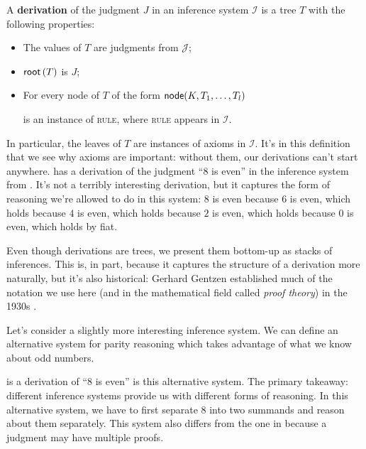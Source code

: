 \begin{definition}
  A \textbf{derivation} of the judgment $J$ in an inference system $\mathcal I$ is a tree $T$ with the following properties:
  \begin{itemize}
  \item The values of $T$ are judgments from $\mathcal J$;
  \item $\mathsf{root}\left(T\right)$ is $J$;
  \item For every node of $T$ of the form $\mathsf{node}(K, T_1, \dots, T_l)$
    \begin{mathpar}
    \end{mathpar}
    is an instance of \textsc{rule}, where \textsc{rule} appears in $\mathcal I$.
  \end{itemize}
\end{definition}
%
In particular, the leaves of $T$ are instances of axioms in $\mathcal I$.
It's in this definition that we see why axioms are important: without them, our derivations can't start anywhere.
 has a derivation of the judgment \enquote{$8$ is even} in the inference system from .
It's not a terribly interesting derivation, but it captures the form of reasoning we're allowed to do in this system: $8$ is even because $6$ is even, which holds because $4$ is even, which holds because $2$ is even, which holds because $0$ is even, which holds by fiat.
\begin{remark}
  Even though derivations are trees, we present them bottom-up as stacks of inferences.
  This is, in part, because it captures the structure of a derivation more naturally, but it's also historical: Gerhard Gentzen established much of the notation we use here (and in the mathematical field called \textit{proof theory}) in the 1930s \cite{gentzen1964investigations}.
\end{remark}
%

\begin{example}
  \label{ex:even-alt}
  Let's consider a slightly more interesting inference system.
  We can define an alternative system for parity reasoning which takes advantage of what we know about odd numbers.
\end{example}
 is a derivation of \enquote{8 is even} is this alternative system.
The primary takeaway: different inference systems provide us with different forms of reasoning.
In this alternative system, we have to first separate $8$ into two summands and reason about them separately.
This system also differs from the one in  because a judgment may have multiple proofs.

